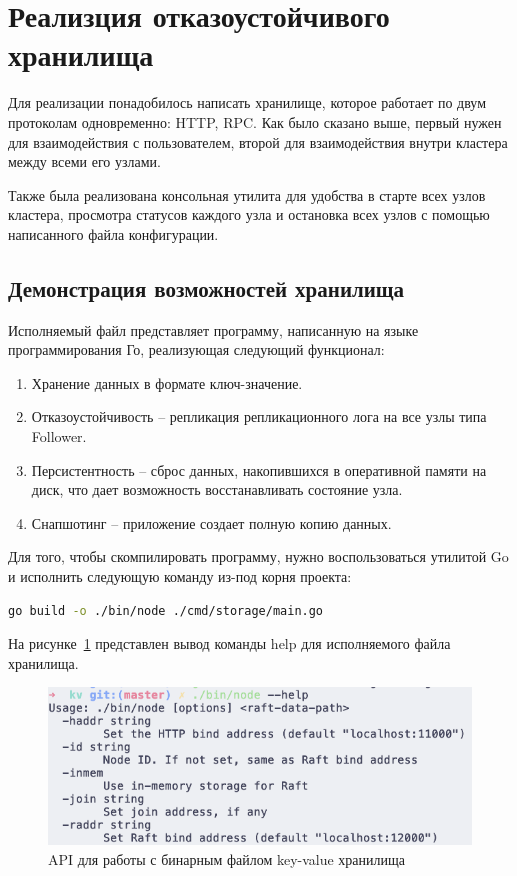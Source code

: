 \section{Реализция отказоустойчивого хранилища}

Для реализации понадобилось написать хранилище, которое работает по двум протоколам одновременно: HTTP, RPC.
Как было сказано выше, первый нужен для взаимодействия с пользователем, второй для взаимодействия внутри кластера
между всеми его узлами.

Также была реализована консольная утилита для удобства в старте всех узлов кластера, просмотра статусов каждого узла и
остановка всех узлов с помощью написанного файла конфигурации.

\subsection{Демонстрация возможностей хранилища}

Исполняемый файл представляет программу, написанную на языке программирования Го, реализующая следующий функционал:

\begin{enumerate}
  \item Хранение данных в формате ключ-значение.
  \item Отказоустойчивость -- репликация репликационного лога на все узлы типа Follower.
  \item Персистентность -- сброс данных, накопившихся в оперативной памяти на диск, что дает возможность восстанавливать
        состояние узла.
  \item Снапшотинг -- приложение создает полную копию данных.
\end{enumerate}

Для того, чтобы скомпилировать программу, нужно воспользоваться утилитой Go и исполнить следующую команду из-под корня проекта:

\begin{lstlisting}[frame=rlbt,language=Bash,caption={Сборка проекта хранилища}]
go build -o ./bin/node ./cmd/storage/main.go
\end{lstlisting}

На рисунке~\ref{fig:fig2} представлен вывод команды help для исполняемого файла хранилища.

\begin{figure}
  \centering
  \includegraphics[scale=0.6]{assets/node.png}
  \caption{API для работы с бинарным файлом key-value хранилища}
  \label{fig:fig2}
\end{figure}

